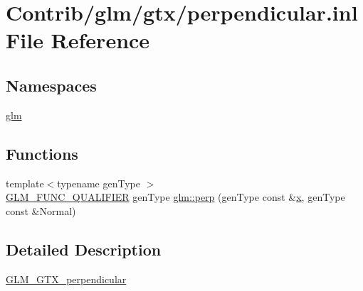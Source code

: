 \hypertarget{perpendicular_8inl}{}\section{Contrib/glm/gtx/perpendicular.inl File Reference}
\label{perpendicular_8inl}
\subsection*{Namespaces}
\begin{DoxyCompactItemize}
\item 
 \mbox{\hyperlink{namespaceglm}{glm}}
\end{DoxyCompactItemize}
\subsection*{Functions}
\begin{DoxyCompactItemize}
\item 
{\footnotesize template$<$typename gen\+Type $>$ }\\\mbox{\hyperlink{setup_8hpp_a33fdea6f91c5f834105f7415e2a64407}{G\+L\+M\+\_\+\+F\+U\+N\+C\+\_\+\+Q\+U\+A\+L\+I\+F\+I\+ER}} gen\+Type \mbox{\hyperlink{group__gtx__perpendicular_ga264cfc4e180cf9b852e943b35089003c}{glm\+::perp}} (gen\+Type const \&\mbox{\hyperlink{_s_d_l__opengl_8h_ad0e63d0edcdbd3d79554076bf309fd47}{x}}, gen\+Type const \&Normal)
\end{DoxyCompactItemize}


\subsection{Detailed Description}
\mbox{\hyperlink{group__gtx__perpendicular}{G\+L\+M\+\_\+\+G\+T\+X\+\_\+perpendicular}} 